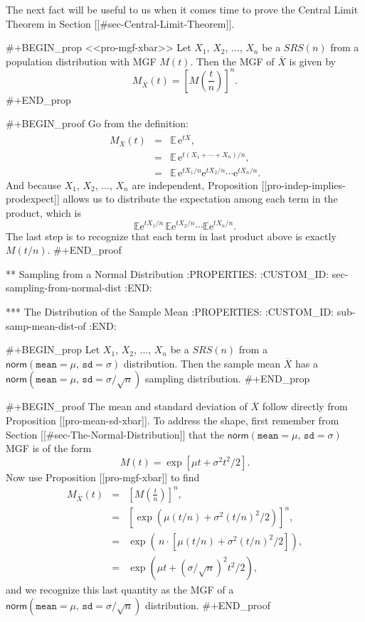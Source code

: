 The next fact will be useful to us when it comes time to prove the
Central Limit Theorem in Section [[#sec-Central-Limit-Theorem]].

#+BEGIN_prop
<<pro-mgf-xbar>> Let \(X_{1}\), \(X_{2}\), ..., \(X_{n}\) be a
\(SRS(n)\) from a population distribution with MGF \(M(t)\). Then the
MGF of \(\overline{X}\) is given by
\begin{equation}
M_{\overline{X}}(t)=\left[M\left(\frac{t}{n}\right)\right]^{n}.
\end{equation}
#+END_prop

#+BEGIN_proof
Go from the definition:
\begin{eqnarray*}
M_{\overline{X}}(t) & = & \mathbb{E}\,\mathrm{e}^{t\overline{X}},\\
 & = & \mathbb{E}\,\mathrm{e}^{t(X_{1}+\cdots+X_{n})/n},\\
 & = & \mathbb{E}\,\mathrm{e}^{tX_{1}/n}\mathrm{e}^{tX_{2}/n}\cdots\mathrm{e}^{tX_{n}/n}.
\end{eqnarray*}
And because \(X_{1}\), \(X_{2}\), ..., \(X_{n}\) are independent,
Proposition [[pro-indep-implies-prodexpect]] allows us to distribute the
expectation among each term in the product, which is \[
\mathbb{E}\mathrm{e}^{tX_{1}/n}\,\mathbb{E}\mathrm{e}^{tX_{2}/n}\cdots\mathbb{E}\mathrm{e}^{tX_{n}/n}.
\] The last step is to recognize that each term in last product above
is exactly \(M(t/n)\).
#+END_proof

** Sampling from a Normal Distribution
:PROPERTIES:
:CUSTOM_ID: sec-sampling-from-normal-dist
:END:

*** The Distribution of the Sample Mean
:PROPERTIES:
:CUSTOM_ID: sub-samp-mean-dist-of
:END:

#+BEGIN_prop
Let \(X_{1}\), \(X_{2}\), ..., \(X_{n}\) be a \(SRS(n)\) from a
\(\mathsf{norm}(\mathtt{mean}=\mu,\,\mathtt{sd}=\sigma)\)
distribution. Then the sample mean \(\overline{X}\) has a
\(\mathsf{norm}(\mathtt{mean}=\mu,\,\mathtt{sd}=\sigma/\sqrt{n})\)
sampling distribution.
#+END_prop

#+BEGIN_proof
The mean and standard deviation of \(\overline{X}\) follow directly
from Proposition [[pro-mean-sd-xbar]]. To address the shape, first
remember from Section [[#sec-The-Normal-Distribution]] that the
\(\mathsf{norm}(\mathtt{mean}=\mu,\,\mathtt{sd}=\sigma)\) MGF is of
the form \[ M(t)=\exp\left[ \mu t+\sigma^{2}t^{2}/2\right] .  \] Now
use Proposition [[pro-mgf-xbar]] to find
\begin{eqnarray*}
M_{\overline{X}}(t) & = & \left[M\left(\frac{t}{n}\right)\right]^{n},\\
 & = & \left[\exp\left( \mu(t/n)+\sigma^{2}(t/n)^{2}/2\right) \right]^{n},\\
 & = & \exp\left( \, n\cdot\left[\mu(t/n)+\sigma^{2}(t/n)^{2}/2\right]\right) ,\\
 & = & \exp\left( \mu t+(\sigma/\sqrt{n})^{2}t^{2}/2\right),
\end{eqnarray*}
and we recognize this last quantity as the MGF of a
\(\mathsf{norm}(\mathtt{mean}=\mu,\,\mathtt{sd}=\sigma/\sqrt{n})\)
distribution.
#+END_proof

